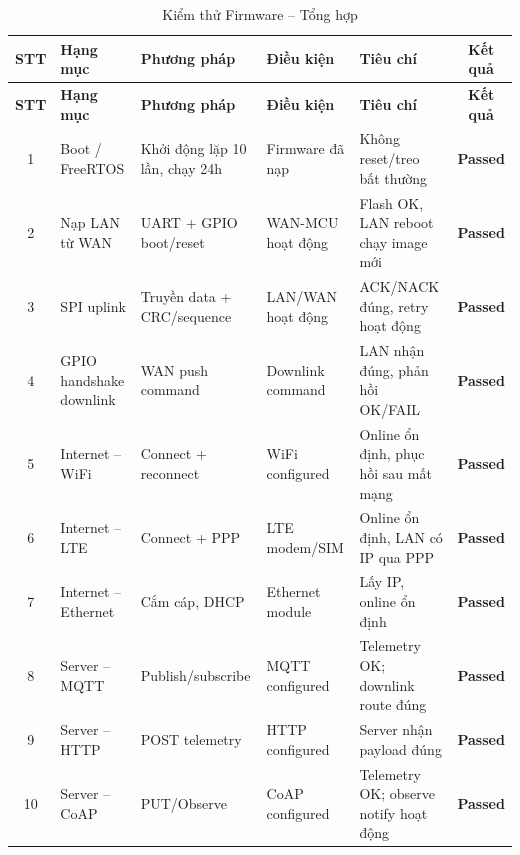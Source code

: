         \begin{longtable}{|c|p{2.5cm}|p{3.5cm}|p{2cm}|p{4cm}|c|}
            \caption{Kiểm thử Firmware -- Tổng hợp}
            \label{tab:test_firmware_summary} \\
            \hline
            \textbf{STT} & \textbf{Hạng mục} & \textbf{Phương pháp} & \textbf{Điều kiện} & \textbf{Tiêu chí} & \textbf{Kết quả} \\ \hline
            \endfirsthead
            \hline
            \textbf{STT} & \textbf{Hạng mục} & \textbf{Phương pháp} & \textbf{Điều kiện} & \textbf{Tiêu chí} & \textbf{Kết quả} \\ \hline
            \endhead
            \hline
            \endfoot
            \endlastfoot

            1 & Boot / FreeRTOS & Khởi động lặp 10 lần, chạy 24h & Firmware đã nạp & Không reset/treo bất thường & \textcolor{modern_blue}{\textbf{Passed}} \\ \hline
            2 & Nạp LAN từ WAN & UART + GPIO boot/reset & WAN-MCU hoạt động & Flash OK, LAN reboot chạy image mới & \textcolor{modern_blue}{\textbf{Passed}} \\ \hline
            3 & SPI uplink & Truyền data + CRC/sequence & LAN/WAN hoạt động & ACK/NACK đúng, retry hoạt động & \textcolor{modern_blue}{\textbf{Passed}} \\ \hline
            4 & GPIO handshake downlink & WAN push command & Downlink command & LAN nhận đúng, phản hồi OK/FAIL & \textcolor{modern_blue}{\textbf{Passed}} \\ \hline
            5 & Internet -- WiFi & Connect + reconnect & WiFi configured & Online ổn định, phục hồi sau mất mạng & \textcolor{modern_blue}{\textbf{Passed}} \\ \hline
            6 & Internet -- LTE & Connect + PPP & LTE modem/SIM & Online ổn định, LAN có IP qua PPP & \textcolor{modern_blue}{\textbf{Passed}} \\ \hline
            7 & Internet -- Ethernet & Cắm cáp, DHCP & Ethernet module & Lấy IP, online ổn định & \textcolor{modern_blue}{\textbf{Passed}} \\ \hline
            8 & Server -- MQTT & Publish/subscribe & MQTT configured & Telemetry OK; downlink route đúng & \textcolor{modern_blue}{\textbf{Passed}} \\ \hline
            9 & Server -- HTTP & POST telemetry & HTTP configured & Server nhận payload đúng & \textcolor{modern_blue}{\textbf{Passed}} \\ \hline
            10 & Server -- CoAP & PUT/Observe & CoAP configured & Telemetry OK; observe notify hoạt động & \textcolor{modern_blue}{\textbf{Passed}} \\ \hline

\end{longtable}
